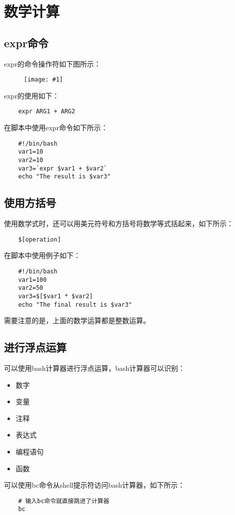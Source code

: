 \documentclass[a4paper,left=2.5cm,right=2.5cm,11pt]{article}
\newcommand{\fic}[1]{\begin{figure}[H]
		\center
		\texttt{[image: \#1]}
	\end{figure}}
\begin{document}
\section{数学计算}
\subsection{expr命令}
	expr的命令操作符如下图所示：
	\fic{3.png}

	expr的使用如下：
	\begin{lstlisting}
	expr ARG1 + ARG2
	\end{lstlisting}

	在脚本中使用expr命令如下所示：
	\begin{lstlisting}
	#!/bin/bash
	var1=10
	var2=10
	var3=`expr $var1 + $var2`
	echo "The result is $var3"
	\end{lstlisting}

\subsection{使用方括号}
	使用数学式时，还可以用美元符号和方括号将数学等式括起来，如下所示：
	\begin{lstlisting}
	$[operation]
	\end{lstlisting}

	在脚本中使用例子如下：
	\begin{lstlisting}
	#!/bin/bash
	var1=100
	var2=50
	var3=$[$var1 * $var2]
	echo "The final result is $var3"
	\end{lstlisting}

	需要注意的是，上面的数学运算都是整数运算。

\subsection{进行浮点运算}
	可以使用bash计算器进行浮点运算，bash计算器可以识别：
	\begin{itemize}
		\item 数字
		\item 变量
		\item 注释
		\item 表达式
		\item 编程语句
		\item 函数
	\end{itemize}
	
	可以使用bc命令从shell提示符访问bash计算器，如下所示：
	\begin{lstlisting}
	# 输入bc命令就直接跳进了计算器
	bc
	\end{lstlisting}
\end{document}
